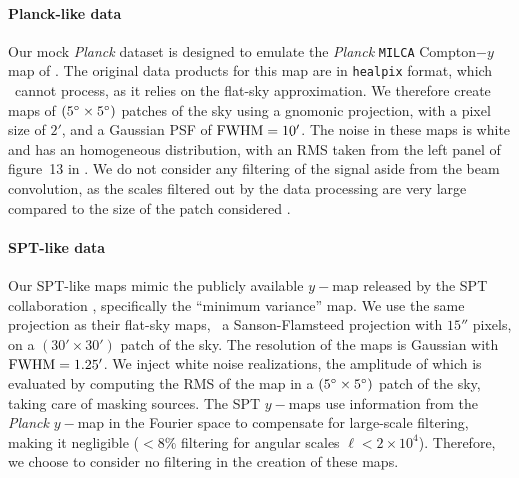 \paragraph{Planck-like data}  %
Our mock \textit{Planck} dataset is designed to emulate the \textit{Planck} \texttt{MILCA} Compton$-y$ map of \citet{planck_collaboration_planck_2016}.
The original data products for this map are in \texttt{healpix} format, which \panco\ cannot process, as it relies on the flat-sky approximation.
We therefore create maps of $(5\degree \times 5\degree)$ patches of the sky using a gnomonic projection, with a pixel size of $2'$, and a Gaussian PSF of ${\rm FWHM} = 10'$.
The noise in these maps is white and has an homogeneous distribution, with an RMS taken from the left panel of figure~13 in \citet{planck_collaboration_planck_2016}.
We do not consider any filtering of the signal aside from the beam convolution, as the scales filtered out by the data processing are very large compared to the size of the patch considered \citep[see][]{planck_collaboration_planck_2016}.

\paragraph{SPT-like data}  %
Our SPT-like maps mimic the publicly available $y-$map released by the SPT collaboration \citep{bleem_cmbksz_2022}, specifically the ``minimum variance'' map.
We use the same projection as their flat-sky maps, \ie\ a Sanson-Flamsteed projection with $15''$ pixels, on a $(30' \times 30')$ patch of the sky.
The resolution of the maps is Gaussian with ${\rm FWHM} = 1.25'$.
We inject white noise realizations, the amplitude of which is evaluated by computing the RMS of the map in a $(5\degree \times 5\degree)$ patch of the sky, taking care of masking sources.
The SPT $y-$maps use information from the \textit{Planck} $y-$map in the Fourier space to compensate for large-scale filtering, making it negligible ($<8\%$ filtering for angular scales $\ell < 2 \times 10^4$).
Therefore, we choose to consider no filtering in the creation of these maps.

